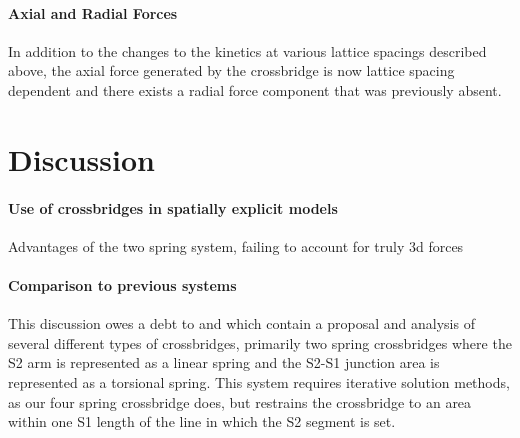 \documentclass[]{article}
\begin{document}
\paragraph{Axial and Radial Forces} %
In addition to the changes to the kinetics at various lattice spacings described above, the axial force generated by the crossbridge is now lattice spacing dependent and there exists a radial force component that was previously absent.



\section{Discussion} %


\paragraph{Use of crossbridges in spatially explicit models} %
Advantages of the two spring system, failing to account for truly 3d forces

\paragraph{Comparison to previous systems} %
This discussion owes a debt to \citet{Schoenberg:1980:p1802} and \citet{Schoenberg:1980:p1627} which contain a proposal and analysis of several different types of crossbridges, primarily two spring crossbridges where the S2 arm is represented as a linear spring and the S2-S1 junction area is represented as a torsional spring. 
This system requires iterative solution methods, as our four spring crossbridge does, but restrains the crossbridge to an area within one S1 length of the line in which the S2 segment is set.
\end{document}
